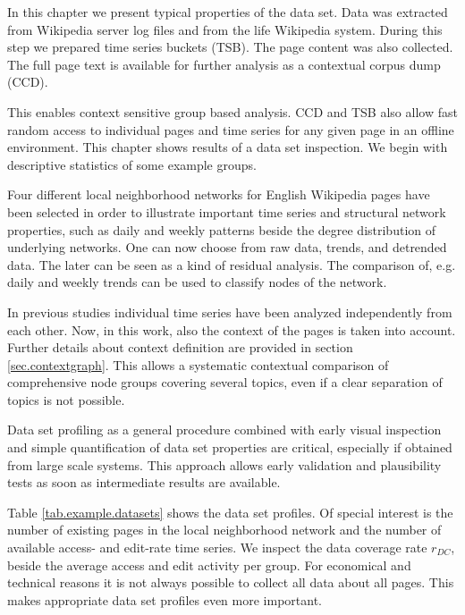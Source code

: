 \documentclass[a4paper,10pt]{scrbook}
\begin{document}
In this chapter we present typical properties of the data set. Data was extracted from Wikipedia server log files and from the life Wikipedia system. During this step we prepared time series buckets (TSB). The page content was also collected. The full page text is available for further analysis as a contextual corpus dump (CCD). 

This enables context sensitive group based analysis. CCD and TSB also allow fast random access to individual pages and time series for any given page in an offline environment. This chapter shows results of a data set inspection. We begin with descriptive statistics of some example groups. 

Four different local neighborhood networks for English Wikipedia pages have been selected in order to illustrate important time series and structural network properties, such as daily and weekly patterns beside the degree distribution of underlying networks. One can now choose from raw data, trends, and detrended data. The later can be seen as a kind of residual analysis. The comparison of, e.g. daily and weekly trends can be used to classify nodes of the network. 

In previous studies \cite{2013arXiv1308.1776S, Boeker2012, Schreck2012, Kaempf2012b, crane2008robust}
individual time series have been analyzed independently from each other. Now, in this work, also the context of the pages is taken into account. Further details about context definition are provided in section \ref{sec.contextgraph}. This allows a systematic contextual comparison of comprehensive node groups covering several topics, even if a clear separation of topics is not possible. 

Data set profiling as a general procedure combined with early visual inspection and simple quantification of data set properties are critical, especially if obtained from large scale systems. This approach allows early validation and plausibility tests as soon as intermediate results are available.

Table \ref{tab.example.datasets} shows the data set profiles. Of special interest is the number of existing pages in the local neighborhood network and the number of available access- and edit-rate time series. We inspect the data coverage rate $r_{DC}$, beside the average access and edit activity per group. For economical and technical reasons it is not always possible to collect all data about all pages. This makes appropriate data set profiles even more important. 
\end{document}
